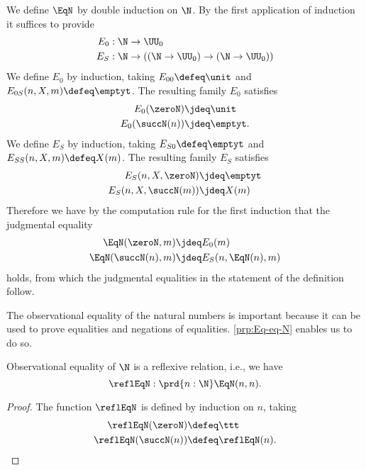 \begin{constr}
We define $\EqN$ by double induction on $\N$. By the first application of induction it suffices to provide
\begin{align*}
E_0 & : \N\to\UU_0 \\
E_S & : \N\to ((\N\to\UU_0)\to(\N\to\UU_0))
\end{align*}
We define $E_0$ by induction, taking $E_{00}\defeq \unit$ and $E_{0S}(n,X,m)\defeq \emptyt$. The resulting family $E_0$ satisfies
\begin{align*}
E_0(\zeroN) & \jdeq \unit \\
E_0(\succN(n)) & \jdeq \emptyt.
\end{align*} 
We define $E_S$ by induction, taking $E_{S0}\defeq \emptyt$ and $E_{SS}(n,X,m)\defeq X(m)$. The resulting family $E_S$ satisfies
\begin{align*}
E_S(n,X,\zeroN) & \jdeq \emptyt \\
E_S(n,X,\succN(m)) & \jdeq X(m) 
\end{align*}
Therefore we have by the computation rule for the first induction that the judgmental equality
\begin{align*}
\EqN(\zeroN,m) & \jdeq E_0(m) \\
\EqN(\succN(n),m) & \jdeq E_S(n,\EqN(n),m)
\end{align*}
holds, from which the judgmental equalities in the statement of the definition follow.
\end{constr}

The observational equality of the natural numbers is important because it can be used to prove equalities and negations of equalities. \cref{prp:Eq-eq-N} enables us to do so.

\begin{lem}
  Observational equality of $\N$ is a reflexive relation, i.e., we have
  \begin{equation*}
    \reflEqN : \prd{n:\N}\EqN(n,n).
  \end{equation*}
\end{lem}

\begin{proof}
  The function $\reflEqN$ is defined by induction on $n$, taking
  \begin{align*}
    \reflEqN(\zeroN) & \defeq \ttt \\
    \reflEqN(\succN(n)) & \defeq \reflEqN(n).\qedhere
  \end{align*}
\end{proof}

